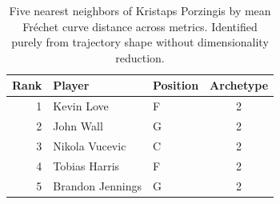 \begin{table}[htbp]
  \centering\small
  \begin{tabular}{rllc}
    \toprule
    Rank & Player & Position & Archetype \\
    \midrule
    1 & Kevin Love & F & 2 \\
    2 & John Wall & G & 2 \\
    3 & Nikola Vucevic & C & 2 \\
    4 & Tobias Harris & F & 2 \\
    5 & Brandon Jennings & G & 2 \\
    \bottomrule
  \end{tabular}
  \caption{Five nearest neighbors of Kristaps Porzingis by mean Fr\'{e}chet curve distance across metrics. Identified purely from trajectory shape without dimensionality reduction.}
  \label{tab:Kristaps_Porzingis_frechet_curve_neighbors}
\end{table}

